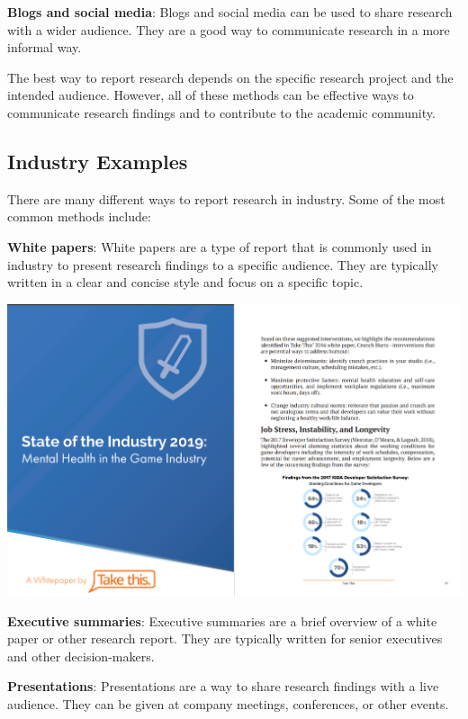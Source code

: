 \documentclass[
  b5paper]{book}
\begin{document}
\textbf{Blogs and social media}: Blogs and social media can be used to share research with a wider audience. They are a good way to communicate research in a more informal way.

The best way to report research depends on the specific research project and the intended audience. However, all of these methods can be effective ways to communicate research findings and to contribute to the academic community.

\hypertarget{industry-examples}{%
\subsection*{Industry Examples}\label{industry-examples}}

There are many different ways to report research in industry. Some of the most common methods include:

\textbf{White papers}: White papers are a type of report that is commonly used in industry to present research findings to a specific audience. They are typically written in a clear and concise style and focus on a specific topic.

\includegraphics[width=1\textwidth,height=\textheight]{images/white_paper.png}

\textbf{Executive summaries}: Executive summaries are a brief overview of a white paper or other research report. They are typically written for senior executives and other decision-makers.

\textbf{Presentations}: Presentations are a way to share research findings with a live audience. They can be given at company meetings, conferences, or other events.
\end{document}
